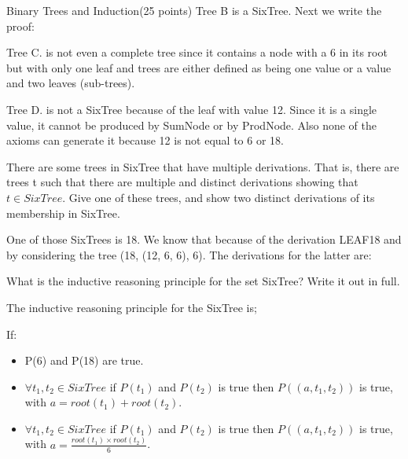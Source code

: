 \documentclass{article}
\begin{document}
\begin{question}{Binary Trees and Induction}{(25 points)}
Tree B is a SixTree. Next we write the proof:

%	
%
%

Tree C. is not even a complete tree since it contains a node with a 6 in its root but with only one leaf and trees are either defined as being one value or a value and two leaves (sub-trees).

Tree D. is not a SixTree because of the leaf with value 12. Since it is a single value, it cannot be produced by SumNode or by ProdNode. Also none of the axioms can generate it because 12 is not equal to 6 or 18.

  \begin{subquestion}
 There are some trees in SixTree that have multiple derivations. That is, there are trees t such that there
are multiple and distinct derivations showing that $t \in SixTree$. Give one of these trees, and show two
distinct derivations of its membership in SixTree.

One of those SixTrees is 18. We know that because of the derivation LEAF18 and by considering the tree (18, (12, 6, 6), 6). The derivations for the latter are:

%		
%	
%	
  \end{subquestion}

  \begin{subquestion} 
    
    \begin{subsubquestion}
    What is the inductive reasoning principle for the set SixTree? Write it out in full.
         
    The inductive reasoning principle for the SixTree is;
    
    If: 
    
    \begin{itemize}
    	\item P(6) and P(18) are true.
    	\item $\forall t_1, t_2 \in SixTree$ if $P(t_1)$ and $P(t_2)$ is true then $P((a, t_1, t_2))$ is true, with $a = root(t_1) + root(t_2)$.
    	\item $\forall t_1, t_2 \in SixTree$ if $P(t_1)$ and $P(t_2)$ is true then $P((a, t_1, t_2))$ is true, with $a = \frac{root(t_1) \times root(t_2)}{6}$.
    \end{itemize}


\end{subsubquestion}
\end{subquestion}
\end{question}
\end{document}
